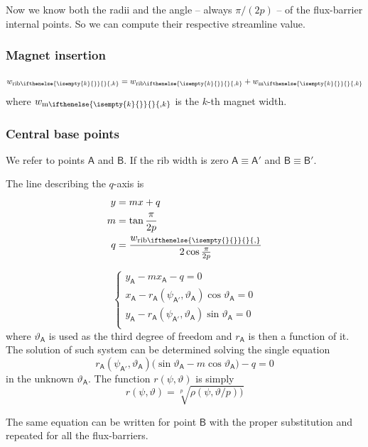 \documentclass[b5paper,11pt,oneside,fleqn]{article}
\newcommand{\pt}[1]{\mathsf{#1}}
\newcommand{\te}{\vartheta}
\newcommand{\wm}[1][]{%
w_{\textup{m}
\ifthenelse{\isempty{#1}{}}{}{,#1}%
}}
\newcommand{\wrib}[1][]{%
w_{\textup{rib}
\ifthenelse{\isempty{#1}{}}{}{,#1}%
}}
\newcommand{\xth}[1]{$ #1 $-th}
\begin{document}
Now we know both the radii and the angle -- always $ \pi/(2p) $ -- of the
flux-barrier internal points. So we can compute their respective streamline
value.



\subsubsection{Magnet insertion}
\[
\wrib[k] = \wrib[k] + \wm[k]
\]
where $ \wm[k] $ is the \xth{k} magnet width.


\subsubsection{Central base points}
We refer to points $ \pt{A} $ and $ \pt{B} $.
If the rib width is zero
$ \pt{A} \equiv \pt{A}' $ and
$ \pt{B} \equiv \pt{B}' $.

The line describing the $ q $-axis is
\begin{equation}
\begin{aligned}
y &= m x + q \\
m &= \tan\frac{\pi}{2p} \\
q &= \frac{\wrib}{2 \cos\frac{\pi}{2p}}
\end{aligned}
\end{equation}

\begin{equation}
\begin{cases}
y_\pt{A} - m x_\pt{A} - q = 0 \\
x_\pt{A} - r_\pt{A}(\psi_\pt{A'},\te_\pt{A}) \cos\te_\pt{A} = 0 \\
y_\pt{A} - r_\pt{A}(\psi_\pt{A'},\te_\pt{A}) \sin\te_\pt{A} = 0 \\
\end{cases}
\end{equation}
where $ \te_\pt{A} $ is used as the third degree of freedom and $ r_\pt{A} $ is
then a function of it.
The solution of such system can be determined solving the single equation
\begin{equation}
r_\pt{A}(\psi_\pt{A'},\te_\pt{A})
\bigl( \sin\te_\pt{A} - m \cos\te_\pt{A} \bigr) - q = 0
\end{equation}
in the unknown $ \te_\pt{A} $.
The function $ r(\psi,\te) $ is simply
\[
r(\psi,\te) = \sqrt[p]{ \rho(\psi,\te/p) \bigr) }
\]

The same equation can be written for point $ \pt{B} $ with the proper
substitution and repeated for all the flux-barriers.
\end{document}
